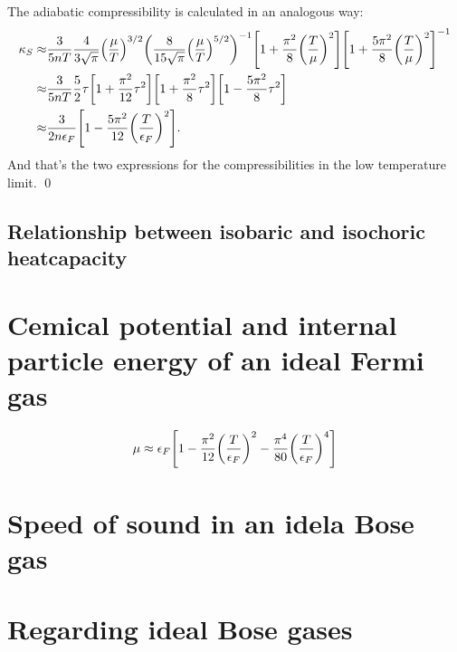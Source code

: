 \documentclass[11pt,letter, swedish, english
]{article}
\begin{document}
The adiabatic compressibility is calculated in an analogous way:
\begin{equation}
\begin{aligned}
\kappa_S\approx& \frac{3}{5nT} 
\frac{4}{3\sqrt{\pi}}\qty(\frac{\mu}{T})^{3/2}
\qty(\frac{8}{15\sqrt{\pi}}\qty(\frac{\mu}{T})^{5/2})^{-1}
\qty[
1+\frac{\pi^2}{8}\qty(\frac{T}{\mu})^2]
\qty[
1+\frac{5\pi^2}{8}\qty(\frac{T}{\mu})^2]^{-1}\\
\approx&
 \frac{3}{5nT}\frac{5}{2}\tau\qty[1 +\frac{\pi^2}{12}\tau^2]
\qty[1+\frac{\pi^2}{8}\tau^2]
\qty[1-\frac{5\pi^2}{8}\tau^2]\\
\approx&\frac{3}{2n\epsilon_F}
\qty[1 - \frac{5\pi^2}{12}\qty(\frac{T}{\epsilon_F})^2].
\end{aligned}
\end{equation}
And that's the two expressions for the compressibilities in the low
temperature limit.
\qed

\subsection{Relationship between isobaric and isochoric heatcapacity}




\section{Cemical potential and internal particle energy of an ideal Fermi gas}


\begin{equation}\label{eq:2_mu}
\mu\approx \epsilon_F \qty[1
-\frac{\pi^2}{12}\qty(\frac{T}{\epsilon_F})^2
-\frac{\pi^4}{80}\qty(\frac{T}{\epsilon_F})^4]
\end{equation}


\section{Speed of sound in an idela Bose gas}



\section{Regarding ideal Bose gases }
\end{document}
